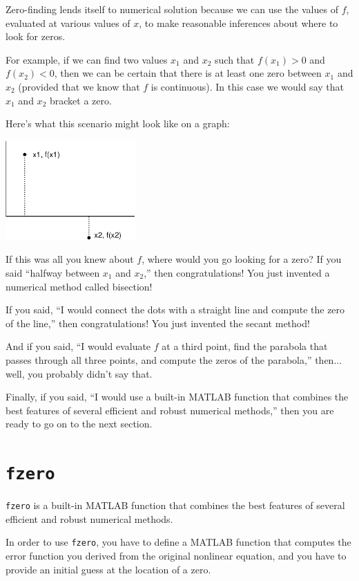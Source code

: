 \documentclass{book}
\begin{document}
Zero-finding lends itself to numerical solution because we can
use the values of $f$, evaluated at various values of $x$, to
make reasonable inferences about where to look for zeros.

For example, if we can find two values $x_1$ and $x_2$ such that
$f(x_1) > 0$ and $f(x_2) < 0$, then we can be certain that there is at
least one zero between $x_1$ and $x_2$ (provided that we know that $f$
is continuous).  In this case we would say that $x_1$ and $x_2$
bracket a zero.

Here's what this scenario might look like on a graph:

\beforefig \centerline{\includegraphics[height=1.5in]{figs/secant.eps}}

If this was all you knew about $f$, where would you go looking for
a zero?  If you said ``halfway between $x_1$ and $x_2$,'' then
congratulations!  You just invented a numerical method called
bisection!

If you said, ``I would connect the dots with a straight line
and compute the zero of the line,'' then
congratulations!  You just invented the secant method!

And if you said, ``I would evaluate $f$ at a third point, find the
parabola that passes through all three points, and compute the zeros
of the parabola,'' then... well, you probably didn't say that.

Finally, if you said, ``I would use a built-in MATLAB function that
combines the best features of several efficient and robust
numerical methods,'' then you are ready to go on to the next section.


\section{{\tt fzero}}
\label{fzero}

{\tt fzero} is a built-in MATLAB function that
combines the best features of several efficient and robust
numerical methods.

In order to use {\tt fzero}, you have to define a MATLAB function
that computes the error function you derived from the original
nonlinear equation, and you have to provide an initial guess at
the location of a zero.
\end{document}
